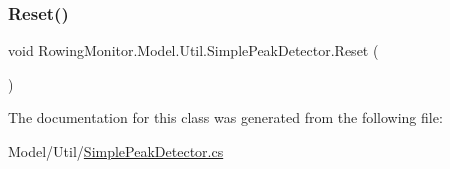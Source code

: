 \mbox{\label{class_rowing_monitor_1_1_model_1_1_util_1_1_simple_peak_detector_a1205317942814083c99bbe88b8215676}} 
\subsubsection{\texorpdfstring{Reset()}{Reset()}}
{\footnotesize\ttfamily void Rowing\+Monitor.\+Model.\+Util.\+Simple\+Peak\+Detector.\+Reset (\begin{DoxyParamCaption}{ }\end{DoxyParamCaption})}



The documentation for this class was generated from the following file\+:\begin{DoxyCompactItemize}
\item 
Model/\+Util/\hyperlink{_simple_peak_detector_8cs}{Simple\+Peak\+Detector.\+cs}\end{DoxyCompactItemize}
